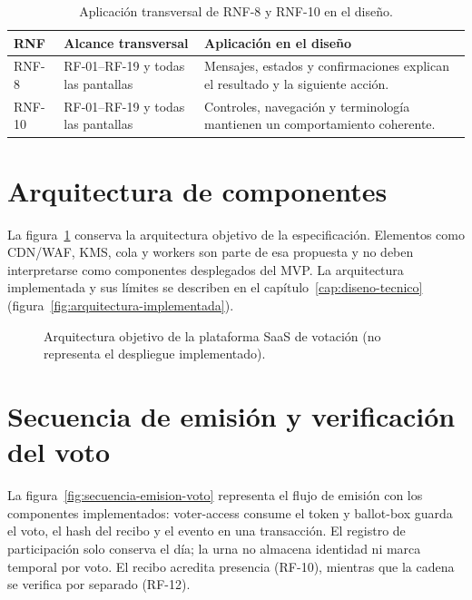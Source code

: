 \begin{table}[htbp]
  \centering
  \caption{Aplicación transversal de RNF-8 y RNF-10 en el diseño.}
  \label{tab:rnf-transversales-diseno}
  \small
  \begin{tabular}{|p{}|p{}|p{}|}
    \hline
    \textbf{RNF} & \textbf{Alcance transversal} & \textbf{Aplicación en el diseño} \\
    \hline
    RNF-8 & RF-01--RF-19 y todas las pantallas & Mensajes, estados y confirmaciones explican el resultado y la siguiente acción. \\
    \hline
    RNF-10 & RF-01--RF-19 y todas las pantallas & Controles, navegación y terminología mantienen un comportamiento coherente. \\
    \hline
  \end{tabular}
\end{table}

\section{Arquitectura de componentes}
\label{sec:arquitectura-componentes}

La figura~\ref{fig:arquitectura-componentes} conserva la arquitectura objetivo
de la especificación. Elementos como CDN/WAF, KMS, cola y workers son parte de
esa propuesta y no deben interpretarse como componentes desplegados del MVP.
La arquitectura implementada y sus límites se describen en el
capítulo~\ref{cap:diseno-tecnico}
(figura~\ref{fig:arquitectura-implementada}).

\begin{figure}[htbp]
  \centering
  \resizebox{0.98\textwidth}{!}{}
  \caption{Arquitectura objetivo de la plataforma SaaS de votación (no representa el despliegue implementado).}
  \label{fig:arquitectura-componentes}
\end{figure}

\section{Secuencia de emisión y verificación del voto}
\label{sec:secuencia-voto}

La figura~\ref{fig:secuencia-emision-voto} representa el flujo de emisión
con los componentes implementados: voter-access consume el token y ballot-box guarda el voto, el
hash del recibo y el evento en una transacción. El registro de participación
solo conserva el día; la urna no almacena identidad ni marca temporal por voto.
El recibo acredita presencia (RF-10), mientras que la cadena se verifica por
separado (RF-12).

